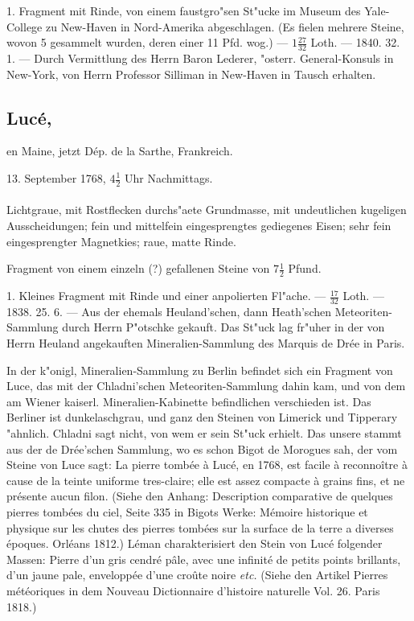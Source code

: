 \documentclass[a4paper, 11pt, oneside, polutonikogreek, german]{article}
\begin{document}
1. Fragment mit Rinde, von einem faustgro"sen St"ucke im Museum des Yale-College zu New-Haven in Nord-Amerika abgeschlagen. (Es fielen mehrere Steine, wovon 5 gesammelt wurden, deren einer 11 Pfd. wog.) --- $1\frac{27}{32}$ Loth. --- 1840. 32. 1. --- Durch Vermittlung des Herrn Baron Lederer, "osterr. General-Konsuls in New-York, von Herrn Professor Silliman in New-Haven in Tausch erhalten.
\subsection[Lucé.]{Lucé,}
\begin{center}
\small
en Maine, jetzt Dép. de la Sarthe, Frankreich.

13. September 1768, $4\frac{1}{2}$ Uhr Nachmittags.
\end{center}
\paragraph{}
Lichtgraue, mit Rostflecken durchs"aete Grundmasse, mit undeutlichen kugeligen Ausscheidungen; fein und mittelfein eingesprengtes gediegenes Eisen; sehr fein eingesprengter Magnetkies; raue, matte Rinde.

Fragment von einem einzeln (?) gefallenen Steine von $7\frac{1}{2}$ Pfund.

1. Kleines Fragment mit Rinde und einer anpolierten Fl"ache. --- $\frac{17}{32}$ Loth. --- 1838. 25. 6. --- Aus der ehemals Heuland'schen, dann Heath'schen Meteoriten-Sammlung durch Herrn P"otschke gekauft. Das St"uck lag fr"uher in der von Herrn Heuland angekauften Mineralien-Sammlung des Marquis de Drée in Paris.

In der k"onigl, Mineralien-Sammlung zu Berlin befindet sich ein Fragment von Luce, das mit der Chladni'schen Meteoriten-Sammlung dahin kam, und von dem am Wiener kaiserl. Mineralien-Kabinette befindlichen verschieden ist. Das Berliner ist dunkelaschgrau, und ganz den Steinen von Limerick und Tipperary "ahnlich. Chladni sagt nicht, von wem er sein St"uck erhielt. Das unsere stammt aus der de Drée'schen Sammlung, wo es schon Bigot de Morogues sah, der vom Steine von Luce sagt: La pierre tombée à Lucé, en 1768, est facile à reconnoître à cause de la teinte uniforme tres-claire; elle est assez compacte à grains fins, et ne présente aucun filon. (Siehe den Anhang: Description comparative de quelques pierres tombées du ciel, Seite 335 in Bigots Werke: Mémoire historique et physique sur les chutes des pierres tombées sur la surface de la terre a diverses époques. Orléans 1812.) Léman charakterisiert den Stein von Lucé folgender Massen: Pierre d’un gris cendré pâle, avec une infinité de petits points brillants, d'un jaune pale, enveloppée d'une croûte noire \emph{etc.} (Siehe den Artikel Pierres météoriques in dem Nouveau Dictionnaire d'histoire naturelle Vol. 26. Paris 1818.)
\end{document}
